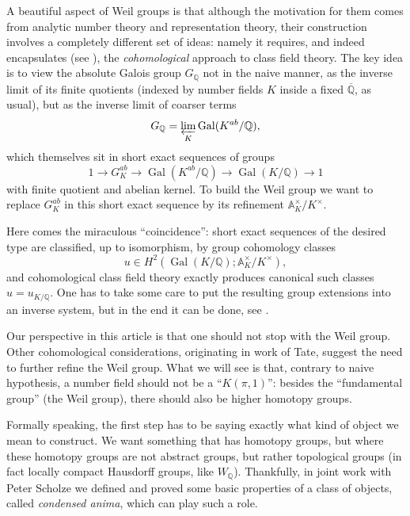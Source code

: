 \documentclass[12pt]{article}
\theoremstyle{definition}
\newcommand{\on}{\operatorname}
\newcommand{\mbb}{\mathbb}
\begin{document}
A beautiful aspect of Weil groups is that although the motivation for them comes from analytic number theory and representation theory, their construction involves a completely different set of ideas: namely it requires, and indeed encapsulates (see \cite{tatentb}), the \emph{cohomological} approach to class field theory.  The key idea is to view the absolute Galois group $G_\mbb{Q}$ not in the naive manner, as the inverse limit of its finite quotients (indexed by number fields $K$ inside a fixed $\overline{\mbb{Q}}$, as usual), but as the inverse limit of coarser terms
$$G_{\mbb{Q}} = \varprojlim_K \on{Gal}(K^{ab}/\mbb{Q}),$$
which themselves sit in short exact sequences of groups
$$1 \to G_K^{ab} \to \on{Gal}(K^{ab}/\mbb{Q}) \to \on{Gal}(K/\mbb{Q}) \to 1$$
with finite quotient and abelian kernel.  To build the Weil group we want to replace $G_K^{ab}$ in this short exact sequence by its refinement $\mbb{A}_K^\times/K^\times$.

Here comes the miraculous ``coincidence'': short exact sequences of the desired type are classified, up to isomorphism, by group cohomology classes
$$u \in H^2(\on{Gal}(K/\mbb{Q});\mathbb{A}_K^\times/K^\times),$$
and cohomological class field theory exactly produces canonical such classes $u=u_{K/\mbb{Q}}$.  One has to take some care to put the resulting group extensions into an inverse system, but in the end it can be done, see \cite{artintate}.

Our perspective in this article is that one should not stop with the Weil group.  Other cohomological considerations, originating in work of Tate, suggest the need to further refine the Weil group.  What we will see is that, contrary to naive hypothesis, a number field should not be a ``$K(\pi,1)$'': besides the ``fundamental group'' (the Weil group), there should also be higher homotopy groups.

Formally speaking, the first step has to be saying exactly what kind of object we mean to construct.  We want something that has homotopy groups, but where these homotopy groups are not abstract groups, but rather topological groups (in fact locally compact Hausdorff groups, like $W_{\mbb{Q}}$).  Thankfully, in joint work with Peter Scholze we defined and proved some basic properties of a class of objects, called \emph{condensed anima}, which can play such a role.
\end{document}

